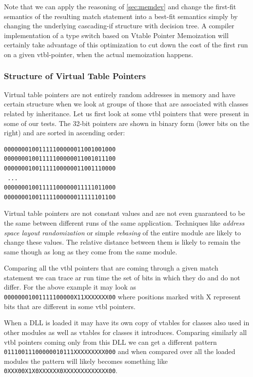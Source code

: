 \documentclass[preprint]{sigplanconf}
\begin{document}
Note that we can apply the reasoning of \textsection\ref{sec:memdev} and change 
the first-fit semantics of the resulting match statement into a best-fit 
semantics simply by changing the underlying cascading-if structure with decision 
tree. A compiler implementation of a type switch based on Vtable Pointer 
Memoization will certainly take advantage of this optimization to cut down the 
cost of the first run on a given vtbl-pointer, when the actual memoization happens.

\subsubsection{Structure of Virtual Table Pointers}
\label{sec:sovtp}

Virtual table pointers are not entirely random addresses in memory and have 
certain structure when we look at groups of those that are associated with 
classes related by inheritance. Let us first look at some vtbl pointers that 
were present in some of our tests. The 32-bit pointers are shown in binary form 
(lower bits on the right) and are sorted in ascending order:

\begin{verbatim}
00000001001111100000011001001000
00000001001111100000011001011100
00000001001111100000011001110000
 ...
00000001001111100000011111011000
00000001001111100000011111101100
\end{verbatim}

Virtual table pointers are not constant values and are not even guaranteed to be 
the same between different runs of the same application. Techniques like 
\emph{address space layout randomization} or simple \emph{rebasing} of the entire 
module are likely to change these values. The relative distance between them is 
likely to remain the same though as long as they come from the same module.

Comparing all the vtbl pointers that are coming through a given match statement 
we can trace ar run time the set of bits in which they do and do not differ. 
For the above example it may look as \texttt{00000001001111100000X11XXXXXXX00} 
where positions marked with X represent bits that are different in some vtbl 
pointers.

When a DLL is loaded it may have its own copy of vtables for classes also used 
in other modules as well as vtables for classes it introduces. Comparing 
similarly all vtbl pointers coming only from this DLL we can get a different 
pattern \\ \texttt{01110011100000010111XXXXXXXXX000} and when compared over all 
the loaded modules the pattern will likely becomes something like 
\texttt{0XXX00X1X0XXXXXX0XXXXXXXXXXXXX00}.
\end{document}

